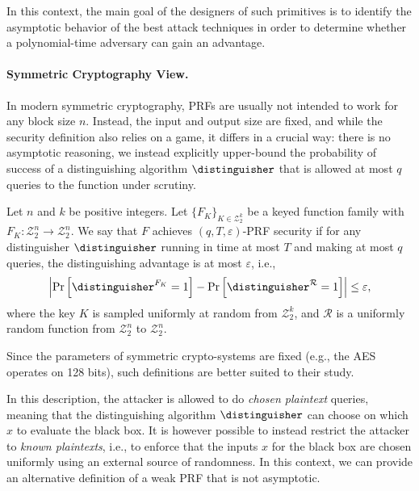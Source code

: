 \documentclass[journal=tosc,submission]{iacrtrans}
\theoremstyle{theorem}
\newcommand\Z{\mathcal{Z}}
\newcommand\aes{\textsf{AES}}
\newcommand\lp[1]{\textcolor{blue!80}{\textbf{Léo:} #1}}
\begin{document}
In this context, the main goal of the designers of such primitives is to identify the asymptotic behavior of the best attack techniques in order to determine whether a polynomial-time adversary can gain an advantage.


\paragraph{Symmetric Cryptography View.}

In modern symmetric cryptography, PRFs are usually not intended to work for any block size $n$. Instead, the input and output size are fixed, and while the security definition also relies on a game, it differs in a crucial way: there is no asymptotic reasoning, we instead explicitly upper-bound the probability of success of a distinguishing algorithm $\distinguisher$ that is allowed at most $q$ queries to the function under scrutiny.

\begin{definition}
Let $n$ and $k$ be positive integers. Let $\{F_K\}_{K \in \Z_2^k}$ be a keyed function family with $F_K : \Z_2^n \to \Z_2^n$. We say that $F$ achieves $(q,T,\varepsilon)$-PRF security if for any distinguisher $\distinguisher$ running in time at most $T$ and making at most $q$ queries, the distinguishing advantage is at most $\varepsilon$, i.e.,
\[
\left| \Pr\left[\distinguisher^{F_K} = 1 \right] - \Pr\left[\distinguisher^{\mathcal{R}} = 1 \right] \right| \leq \varepsilon,
\]
where the key $K$ is sampled uniformly at random from $\Z_2^k$, and $\mathcal{R}$ is a uniformly random function from $\Z_2^n$ to $\Z_2^n$.
\end{definition}


Since the parameters of symmetric crypto-systems are fixed (e.g., the \aes{} operates on 128 bits), such definitions are better suited to their study.

In this description, the attacker is allowed to do \emph{chosen plaintext} queries, meaning that the distinguishing algorithm $\distinguisher$ can choose on which $x$ to evaluate the black box. It is however possible to instead restrict the attacker to \emph{known plaintexts}, i.e., to enforce that the inputs $x$ for the black box are chosen uniformly using an external source of randomness. In this context, we can provide an alternative definition of a weak PRF that is not asymptotic.
\end{document}
